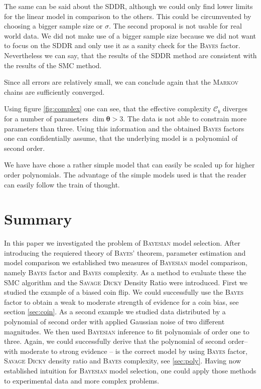 \documentclass[%
 reprint,
 amsmath,amssymb,
 aps,
]{revtex4-1}
\newcommand{\btheta}{\boldsymbol{\theta}}
\begin{document}
The same can be said about the SDDR, although we could only find lower limits for the linear model in comparison to the others. This could be circumvented by choosing a bigger sample size or $\sigma$. The second proposal is not usable for real world data. We did not make use of a bigger sample size because we did not want to focus on the SDDR and only use it as a sanity check for the \textsc{Bayes} factor. Nevertheless we can say, that the results of the SDDR method are consistent with the results of the SMC method.

Since all errors are relatively small, we can conclude again that the \textsc{Markov} chains are sufficiently converged.

Using figure \ref{fig:complex} one can see, that the effective complexity $\mathcal{C}_b$ diverges for a number of parameters $\dim{\btheta}>3$. The data is not able to constrain more parameters than three. Using this information and the obtained \textsc{Bayes} factors one can confidentially assume, that the underlying model is a polynomial of second order. 

We have have chose a rather simple model that can easily be scaled up for higher order polynomials. The advantage of the simple models used is that the reader can easily follow the train of thought.  

\section{Summary}
\noindent In this paper we investigated the problem of \textsc{Bayesian} model selection. After introducing the requiered theory of \textsc{Bayes'} theorem, parameter estimation and model comparison we established two measures of \textsc{Bayesian} model comparison, namely \textsc{Bayes} factor and \textsc{Bayes} complexity. As a method to evaluate these the SMC algorithm and the \textsc{Savage Dicky} Density Ratio were introduced. First we studied the example of a biased coin flip. We could successfully use the \textsc{Bayes} factor to obtain a weak to moderate strength of evidence for a coin bias, see section \eqref{sec:coin}. As a second example we studied data distributed by a polynomial of second order with applied Gaussian noise of two different magnitudes. We then used \textsc{Bayesian} inference to fit polynomials of order one to three. Again, we could successfully derive that the polynomial of second order-- with moderate to strong evidence -- is the correct model by using \textsc{Bayes} factor, \textsc{Savage Dicky} density ratio and \textsc{Bayes} complexity, see \eqref{sec:poly}. Having now established intuition for \textsc{Bayesian} model selection, one could apply those methods to experimental data and more complex problems.


\noindent 
\FloatBarrier

\end{document}
